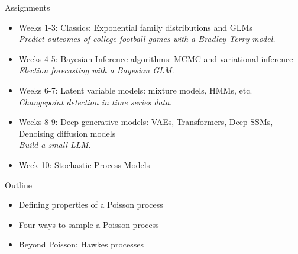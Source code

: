 \documentclass[aspectratio=169]{beamer}
\begin{document}
\begin{frame}{Assignments}

\begin{itemize}
\item Weeks 1-3: Classics: Exponential family distributions and GLMs \\
\qquad \textit{Predict outcomes of college football games with a Bradley-Terry model.}

\item Weeks 4-5: Bayesian Inference algorithms: MCMC and variational inference \\
\qquad \textit{Election forecasting with a Bayesian GLM.}

\item Weeks 6-7: Latent variable models: mixture models, HMMs, etc. \\
\qquad \textit{Changepoint detection in time series data.}

\item Weeks 8-9: Deep generative models: VAEs, Transformers, Deep SSMs, Denoising diffusion models \\
\qquad \textit{Build a small LLM.}

\item Week 10: Stochastic Process Models
\end{itemize}
\end{frame}
    

\begin{frame}{Outline}
\begin{itemize}
    \item Defining properties of a Poisson process
    \item Four ways to sample a Poisson process
    \item Beyond Poisson: Hawkes processes 
\end{itemize}
\end{frame}
\end{document}
